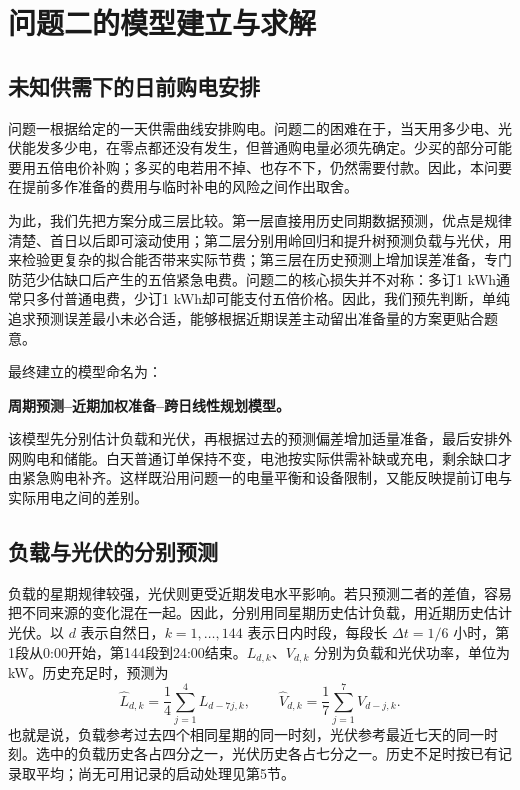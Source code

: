 \section{问题二的模型建立与求解}
\subsection{未知供需下的日前购电安排}

问题一根据给定的一天供需曲线安排购电。问题二的困难在于，当天用多少电、光伏能发多少电，在零点都还没有发生，但普通购电量必须先确定。少买的部分可能要用五倍电价补购；多买的电若用不掉、也存不下，仍然需要付款。因此，本问要在提前多作准备的费用与临时补电的风险之间作出取舍。

为此，我们先把方案分成三层比较。第一层直接用历史同期数据预测，优点是规律清楚、首日以后即可滚动使用；第二层分别用岭回归和提升树预测负载与光伏，用来检验更复杂的拟合能否带来实际节费；第三层在历史预测上增加误差准备，专门防范少估缺口后产生的五倍紧急电费。问题二的核心损失并不对称：多订1 kWh通常只多付普通电费，少订1 kWh却可能支付五倍价格。因此，我们预先判断，单纯追求预测误差最小未必合适，能够根据近期误差主动留出准备量的方案更贴合题意。

最终建立的模型命名为：

\textbf{周期预测--近期加权准备--跨日线性规划模型。}

该模型先分别估计负载和光伏，再根据过去的预测偏差增加适量准备，最后安排外网购电和储能。白天普通订单保持不变，电池按实际供需补缺或充电，剩余缺口才由紧急购电补齐。这样既沿用问题一的电量平衡和设备限制，又能反映提前订电与实际用电之间的差别。

\subsection{负载与光伏的分别预测}

负载的星期规律较强，光伏则更受近期发电水平影响。若只预测二者的差值，容易把不同来源的变化混在一起。因此，分别用同星期历史估计负载，用近期历史估计光伏。以 $d$ 表示自然日，$k=1,\ldots,144$ 表示日内时段，每段长 $\Delta t=1/6$ 小时，第1段从0:00开始，第144段到24:00结束。$L_{d,k}$、$V_{d,k}$ 分别为负载和光伏功率，单位为 kW。历史充足时，预测为
\begin{equation}
\widehat L_{d,k}=\frac14\sum_{j=1}^{4}L_{d-7j,k},\qquad
\widehat V_{d,k}=\frac17\sum_{j=1}^{7}V_{d-j,k}.
\label{eq:q2-forecast}
\end{equation}
也就是说，负载参考过去四个相同星期的同一时刻，光伏参考最近七天的同一时刻。选中的负载历史各占四分之一，光伏历史各占七分之一。历史不足时按已有记录取平均；尚无可用记录的启动处理见第5节。

